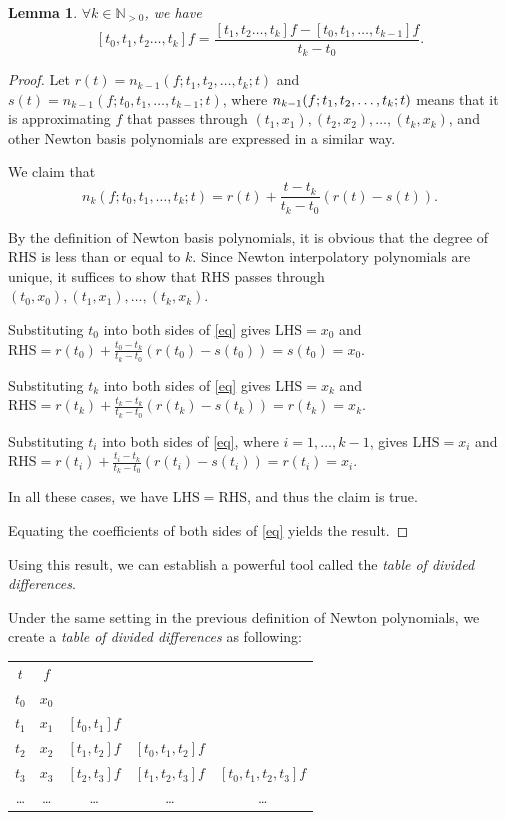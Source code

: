 \documentclass[a4paper,11pt,titlepage]{article}
\theoremstyle{definition}
\theoremstyle{plain}
\newtheorem{lemma}[theorem]{Lemma}
\theoremstyle{remark}
\begin{document}
\begin{lemma}\label{lemma62}
    $\forall k\in\mathbb{N}_{>0}$, we have $$[t_0,t_1,t_2\dots,t_k]f=\frac{[t_1,t_2\dots,t_k]f-[t_0,t_1,\dots,t_{k-1}]f}{t_k-t_0}.$$
\end{lemma}
\begin{proof}
    Let $r(t)=n_{k-1}(f;t_1,t_2,\dots,t_k;t)$ and $s(t)=n_{k-1}(f;t_0,t_1,\dots,t_{k-1};t)$, where $n_{k-1}(f;\\t_1,t_2,\dots,t_k;t)$ means that it is approximating $f$ that passes through $(t_1,x_1), (t_2,x_2), \dots, (t_k,x_k)$, and other Newton basis polynomials are expressed in a similar way.
    
    We claim that
    \begin{equation}\label{eq}
        n_k(f;t_0,t_1,\dots,t_k;t)=r(t)+\frac{t-t_k}{t_k-t_0}(r(t)-s(t)).\tag{*}
    \end{equation}

    By the definition of Newton basis polynomials, it is obvious that the degree of $\mathrm{RHS}$ is less than or equal to $k$. Since Newton interpolatory polynomials are unique, it suffices to show that $\mathrm{RHS}$ passes through $(t_0,x_0), (t_1,x_1), \dots, (t_k,x_k)$.
    
    Substituting $t_0$ into both sides of \ref{eq} gives $\mathrm{LHS}=x_0$ and $\mathrm{RHS}=r(t_0)+\frac{t_0-t_k}{t_k-t_0}(r(t_0)-s(t_0))=s(t_0)=x_0.$

    Substituting $t_k$ into both sides of \ref{eq} gives $\mathrm{LHS}=x_k$ and $\mathrm{RHS}=r(t_k)+\frac{t_k-t_k}{t_k-t_0}(r(t_k)-s(t_k))=r(t_k)=x_k.$

    Substituting $t_i$ into both sides of \ref{eq}, where $i=1,\dots,k-1$, gives $\mathrm{LHS}=x_i$ and $\mathrm{RHS}=r(t_i)+\frac{t_i-t_k}{t_k-t_0}(r(t_i)-s(t_i))=r(t_i)=x_i.$

    In all these cases, we have $\mathrm{LHS} = \mathrm{RHS}$, and thus the claim is true.

    Equating the coefficients of both sides of \ref{eq} yields the result.
\end{proof}

Using this result, we can establish a powerful tool called the \textit{table of divided differences}.

 Under the same setting in the previous definition of Newton polynomials, we create a \textit{table of divided differences} as following:

\begin{center}
\begin{tabular}{ c c c c c }
 $t$ & $f$ & & & \\ 
 $t_0$ & $x_0$ & & & \\  
 $t_1$ & $x_1$ & $[t_0,t_1]f$ & & \\
 $t_2$ & $x_2$ & $[t_1,t_2]f$ & $[t_0,t_1,t_2]f$ & \\
 $t_3$ & $x_3$ & $[t_2,t_3]f$ & $[t_1,t_2,t_3]f$ &  $[t_0,t_1,t_2,t_3]f$ \\
 \dots & \dots & \dots & \dots & \dots
\end{tabular}
\end{center}
\end{document}

